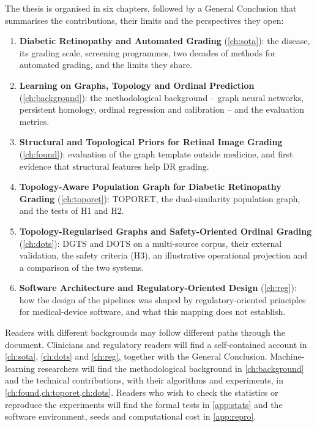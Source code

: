 The thesis is organised in six chapters, followed by a General
Conclusion that summarises the contributions, their limits and the perspectives they open:
\begin{enumerate}[leftmargin=1.6em,itemsep=3pt]
\item \textbf{Diabetic Retinopathy and Automated Grading} (\cref{ch:sota}): the disease,
its grading scale, screening programmes, two decades of methods for automated grading, and the limits
they share.
\item \textbf{Learning on Graphs, Topology and Ordinal Prediction}
(\cref{ch:background}): the methodological background -- graph neural networks,
persistent homology, ordinal regression and calibration -- and the evaluation metrics.
\item \textbf{Structural and Topological Priors for Retinal Image Grading}
(\cref{ch:found}): evaluation of the graph template outside medicine, and first evidence
that structural features help DR grading.
\item \textbf{Topology-Aware Population Graph for Diabetic Retinopathy Grading}
(\cref{ch:toporet}): TOPORET, the dual-similarity population graph, and the tests of H1
and H2.
\item \textbf{Topology-Regularised Graphs and Safety-Oriented Ordinal Grading}
(\cref{ch:dots}): DGTS and DOTS on a multi-source corpus, their external validation, the
safety criteria (H3), an illustrative operational projection and a comparison of the two
systems.
\item \textbf{Software Architecture and Regulatory-Oriented Design} (\cref{ch:reg}): how
the design of the pipelines was shaped by regulatory-oriented principles for
medical-device software, and what this mapping does not establish.
\end{enumerate}

Readers with different backgrounds may follow different paths through the document.
Clinicians and regulatory readers will find a self-contained account in \cref{ch:sota},
\cref{ch:dots} and \cref{ch:reg}, together with the General Conclusion. Machine-learning
researchers will find the methodological background in \cref{ch:background} and the
technical contributions, with their algorithms and experiments, in
\cref{ch:found,ch:toporet,ch:dots}. Readers who wish to check the statistics or reproduce
the experiments will find the formal tests in \cref{app:stats} and the software
environment, seeds and computational cost in \cref{app:repro}.
